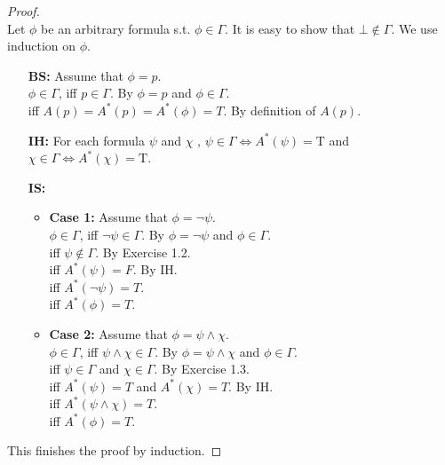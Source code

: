 \documentclass[12pt,a4paper]{article}
\theoremstyle{plain}
\theoremstyle{definition}
\begin{document}
\begin{proof}\ \\
    Let $\phi$ be an arbitrary formula s.t. $\phi \in \Gamma$. It is easy to show that $\bot \notin \Gamma$. We use induction on $\phi$.
        \begin{itemize}
            \item[\textbf{BS:}]
                Assume that $\phi=p$.\\
                $\phi \in \Gamma$, iff $p \in \Gamma$. \hfill By $\phi = p$ and $\phi \in \Gamma$.\\
                \phantom{$\phi \in \Gamma$, }iff $A(p)=A^*(p)=A^*(\phi)=T$. \hfill By definition of $A(p)$.\\
            
            \item[\textbf{IH:}]
                For each formula $\psi$ and $\chi$ , $\psi \in \Gamma \Leftrightarrow A^* (\psi) = \text{T}$ and $\chi \in \Gamma \Leftrightarrow A^* (\chi) = \text{T}$.
            
            \item[\textbf{IS:}]
                \begin{itemize}
                    \item \textbf{Case 1:} 
                    Assume that $\phi= \neg \psi$.\\
                    $\phi \in \Gamma$, iff $\neg \psi \in \Gamma$. \hfill By $\phi= \neg \psi$ and $\phi \in \Gamma$. \\
                    \phantom{$\phi \in \Gamma$, }iff $\psi \notin \Gamma$. \hfill By Exercise 1.2.\\
                    \phantom{$\phi \in \Gamma$, }iff $A^*(\psi)=F$. \hfill By IH.\\
                    \phantom{$\phi \in \Gamma$, }iff $A^*(\neg \psi)=T$.\\
                    \phantom{$\phi \in \Gamma$, }iff $A^*(\phi)=T$.
                    
                    \item \textbf{Case 2:}
                    Assume that $\phi= \psi \wedge \chi$.\\
                    $\phi \in \Gamma$, iff $\psi \wedge \chi \in \Gamma$. \hfill By $\phi= \psi \wedge \chi$ and $\phi \in \Gamma$. \\  
                    \phantom{$\phi \in \Gamma$, }iff $\psi \in \Gamma$ and $\chi \in \Gamma$. \hfill By Exercise 1.3.\\ 
                    \phantom{$\phi \in \Gamma$, }iff $A^*(\psi)=T$ and $A^*(\chi)=T$. \hfill By IH.\\
                    \phantom{$\phi \in \Gamma$, }iff $A^*(\psi \wedge \chi)=T$.\\
                    \phantom{$\phi \in \Gamma$, }iff $A^*(\phi)=T$.
                \end{itemize}
        \end{itemize}
    This finishes the proof by induction.
\end{proof}
\end{document}
